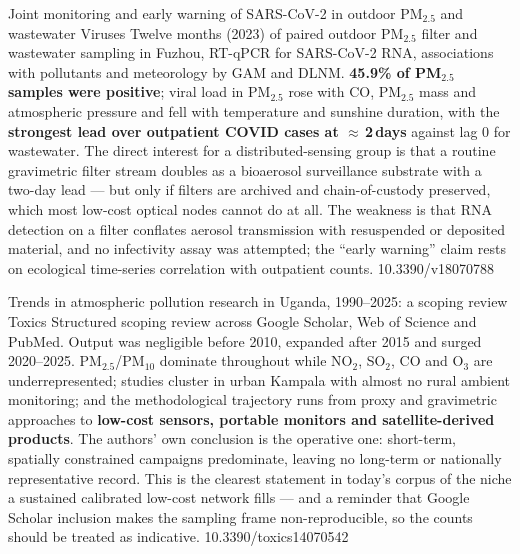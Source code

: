 \documentclass[10pt]{article}
\begin{document}
{Joint monitoring and early warning of SARS-CoV-2 in outdoor PM$_{2.5}$ and wastewater}
{Viruses}
{Twelve months (2023) of paired outdoor PM$_{2.5}$ filter and wastewater sampling in
Fuzhou, RT-qPCR for SARS-CoV-2 RNA, associations with pollutants and meteorology by GAM
and DLNM. \textbf{45.9\% of PM$_{2.5}$ samples were positive}; viral load in PM$_{2.5}$
rose with CO, PM$_{2.5}$ mass and atmospheric pressure and fell with temperature and
sunshine duration, with the \textbf{strongest lead over outpatient COVID cases at
$\approx$\,2\,days} against lag 0 for wastewater. The direct interest for a
distributed-sensing group is that a routine gravimetric filter stream doubles as a
bioaerosol surveillance substrate with a two-day lead --- but only if filters are archived
and chain-of-custody preserved, which most low-cost optical nodes cannot do at all. The
weakness is that RNA detection on a filter conflates aerosol transmission with resuspended
or deposited material, and no infectivity assay was attempted; the ``early warning'' claim
rests on ecological time-series correlation with outpatient counts.}
{10.3390/v18070788}

{Trends in atmospheric pollution research in Uganda, 1990--2025: a scoping review}
{Toxics}
{Structured scoping review across Google Scholar, Web of Science and PubMed. Output was
negligible before 2010, expanded after 2015 and surged 2020--2025. PM$_{2.5}$/PM$_{10}$
dominate throughout while NO$_2$, SO$_2$, CO and O$_3$ are underrepresented; studies
cluster in urban Kampala with almost no rural ambient monitoring; and the methodological
trajectory runs from proxy and gravimetric approaches to \textbf{low-cost sensors,
portable monitors and satellite-derived products}. The authors' own conclusion is the
operative one: short-term, spatially constrained campaigns predominate, leaving no
long-term or nationally representative record. This is the clearest statement in today's
corpus of the niche a sustained calibrated low-cost network fills --- and a reminder that
Google Scholar inclusion makes the sampling frame non-reproducible, so the counts should
be treated as indicative.}
{10.3390/toxics14070542}
\end{document}
